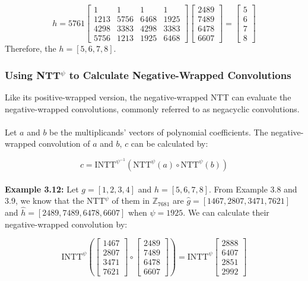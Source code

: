 \documentclass[12pt]{report}
\begin{document}
\[
h = 5761
\begin{bmatrix}
1 & 1 & 1 & 1 \\
1213 & 5756 & 6468 & 1925 \\
4298 & 3383 & 4298 & 3383 \\
5756 & 1213 & 1925 & 6468
\end{bmatrix}
\begin{bmatrix}
2489 \\
7489 \\
6478 \\
6607
\end{bmatrix} = \begin{bmatrix}
5 \\
6 \\
7 \\
8
\end{bmatrix}
\]
Therefore, the $h = [5,6,7,8]$.

\subsubsection{Using NTT$^{\psi}$ to Calculate Negative-Wrapped Convolutions}

Like its positive-wrapped version, the negative-wrapped NTT can evaluate the negative-wrapped convolutions, commonly referred to as negacyclic convolutions. \\ \\
Let $a$ and $b$ be the multiplicands' vectors of polynomial coefficients. The negative-wrapped convolution of $a$ and $b$, $c$ can be calculated by:

\[
c = \text{INTT}^{{\psi}^{-1}}(\text{NTT}^{\psi}(a) \circ \text{NTT}^{\psi}(b))
\] \\
\textbf{Example 3.12:} Let $g = [1,2,3,4]$ and $h = [5,6,7,8]$. From Example 3.8 and 3.9, we know that the NTT$^{\psi}$ of them in $\mathbb{Z}_{7681}$ are $\hat{g} = [1467,2807,3471,7621]$ and $\hat{h} = [2489,7489,6478,6607]$ when $\psi = 1925$. We can calculate their negative-wrapped convolution by:

\[
\text{INTT}^{\psi}\left(
\begin{bmatrix}
1467 \\
2807 \\
3471 \\
7621
\end{bmatrix}
\circ
\begin{bmatrix}
2489 \\
7489 \\
6478 \\
6607
\end{bmatrix}
\right) = \text{INTT}^{\psi}
\begin{bmatrix}
2888 \\
6407 \\
2851 \\
2992
\end{bmatrix}
\]
\end{document}
